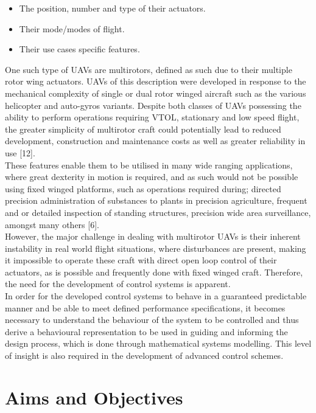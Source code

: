 \documentclass[12pt,a4paper,twoside]{report}
\begin{document}
			\begin{itemize}
				\item
					The position, number and type of their actuators.
				\item 
					Their mode/modes of flight. 
				\item 
					Their use cases specific features.
			\end{itemize}
			\space
			One such type of UAVs are multirotors, defined as such due to their multiple rotor wing actuators. UAVs of this description were developed in response to the mechanical complexity of single or dual rotor winged aircraft such as the various helicopter and auto-gyros variants. Despite both classes of UAVs possessing the ability to perform operations requiring VTOL, stationary and low speed flight, the greater simplicity of multirotor craft could potentially lead to reduced development, construction and maintenance costs as well as greater reliability in use [12].
			\\
			These features enable them to be utilised in many wide ranging applications, where great dexterity in motion is required, and as such would not be possible using fixed winged platforms, such as operations required during; directed precision administration of substances to plants in precision agriculture, frequent and or detailed inspection of standing structures, precision wide area surveillance, amongst many others [6].
			\\
			However, the major challenge in dealing with multirotor UAVs is their inherent instability in real world flight situations, where disturbances are present, making it impossible to operate these craft with direct open loop control of their actuators, as is possible and frequently done with fixed winged craft. Therefore, the need for the development of control systems is apparent. 
			\\
			In order for the developed control systems to behave in a guaranteed predictable manner and be able to meet defined performance specifications, it becomes necessary to understand the behaviour of the system to be controlled and thus derive a behavioural representation to be used in guiding and informing the design process, which is done through mathematical systems modelling. This level of insight is also required in the development of advanced control schemes.
		
		\section{Aims and Objectives}
			
\end{document}
